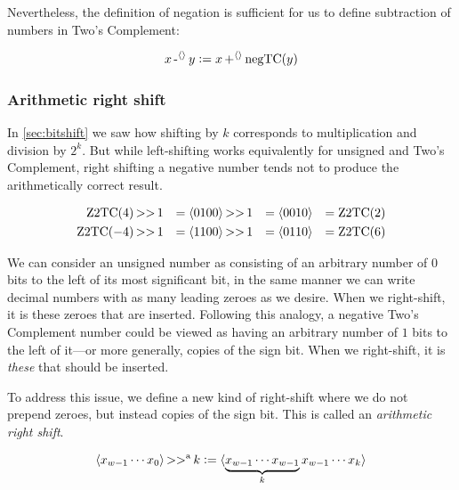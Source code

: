 Nevertheless, the definition of negation is sufficient for us to
define subtraction of numbers in Two's Complement:

\begin{definition}
  \begin{align*}
    x \operatorname{-^{\langle\rangle}} y \vcentcolon= x \operatorname{+^{\langle\rangle}} \mathrm{negTC}(y)
  \end{align*}
  \label{def:intsub}
\end{definition}

\subsubsection{Arithmetic right shift}
\label{sec:arithmetic-right-shift}

In \cref{sec:bitshift} we saw how shifting by $k$ corresponds to
multiplication and division by $2^{k}$.  But while left-shifting works
equivalently for unsigned and Two's Complement, right shifting a
negative number tends not to produce the arithmetically correct result.

\begin{example}
  \begin{align}
    \mathrm{Z2TC}(4) \operatorname{>>} 1 &&= \langle 0100 \rangle \operatorname{>>} 1 &&= \langle 0010 \rangle &&= \mathrm{Z2TC}(2) \\
    \mathrm{Z2TC}(-4) \operatorname{>>} 1 &&= \langle 1100 \rangle \operatorname{>>} 1 &&= \langle 0110 \rangle &&= \mathrm{Z2TC}(6)
  \end{align}
\end{example}

We can consider an unsigned number as consisting of an arbitrary number
of $0$ bits to the left of its most significant bit, in the same
manner we can write decimal numbers with as many leading zeroes as we
desire.  When we right-shift, it is these zeroes that are inserted.
Following this analogy, a negative Two's Complement number could be
viewed as having an arbitrary number of $1$ bits to the left of
it---or more generally, copies of the sign bit.  When we right-shift,
it is \emph{these} that should be inserted.

To address this issue, we define a new kind of right-shift where we do
not prepend zeroes, but instead copies of the sign bit.  This is
called an \emph{arithmetic right shift}.

\begin{definition}
  \begin{align*}
    \langle x_{w-1}\cdots{}x_{0} \rangle \operatorname{>>^{a}} k \vcentcolon=
    \langle \underbrace{x_{w-1} \cdots x_{w-1}}_{k} x_{w-1}\cdots{}x_{k} \rangle
  \end{align*}
  \label{def:bits-rightshift-arithmetic}
\end{definition}

